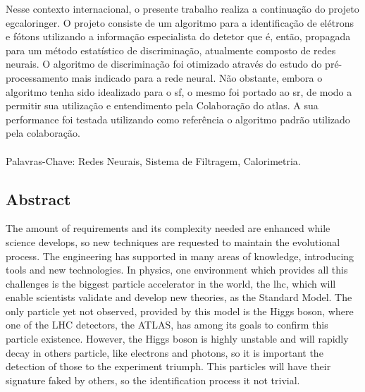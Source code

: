 Nesse contexto internacional, o presente trabalho realiza a continuação
do projeto \acrshort{egcaloringer}. O projeto consiste de um algoritmo 
para a identificação de elétrons e fótons utilizando a informação especialista 
do detetor que é, então, propagada para um método estatístico de discriminação, 
atualmente composto de redes neurais. O algoritmo de discriminação foi otimizado 
através do estudo do pré-processamento mais indicado para a rede neural. 
Não obstante, embora o algoritmo tenha sido idealizado para o \gls{sf}, 
o mesmo foi portado ao \gls{sr}, de modo a permitir sua utilização e 
entendimento pela Colaboração do \acrshort{atlas}. A sua performance foi 
testada utilizando como referência o algoritmo padrão utilizado 
pela colaboração.

\paragraph*{}

\noindent Palavras-Chave: Redes Neurais, Sistema de Filtragem, Calorimetria.

\vfill

\cleardoublepage

\vfill
\begin{center}
\section*{Abstract\label{Abstract}}
\end{center}

The amount of requirements and its complexity needed are enhanced while science
develops, so new techniques are requested to maintain the evolutional process.
The engineering has supported in many areas of knowledge, introducing tools and
new technologies.
In physics, one environment which provides all this challenges is the biggest
particle accelerator in the world, the \acrshort{lhc}, which will enable
scientists validate and develop new theories, as the Standard Model. The only
particle yet not observed, provided by this model is the Higgs boson, where
one of the LHC detectors, the ATLAS, has among its goals to confirm this
particle existence. However, the Higgs boson is highly unstable and will rapidly
decay in others particle, like electrons and photons, so it is important the
detection of those to the experiment triumph. This particles will have their
signature faked by others, so the identification process it not trivial.

